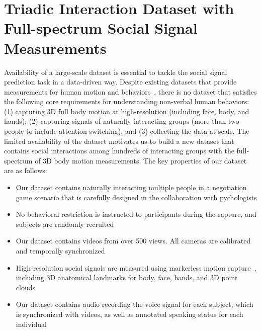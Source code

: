 
\section{Triadic Interaction Dataset with Full-spectrum Social Signal Measurements}
\label{chapter:dataset}
Availability of a large-scale dataset is essential to tackle the social signal prediction task in a data-driven way. Despite existing datasets that provide measurements for human motion and behaviors~\cite{carletta2005ami, Lepri-12, Zen-10,Cristani-11, SALSA-15, h36m_pami}, there is no dataset that satisfies the following core requirements for understanding non-verbal human behaviors: (1) capturing 3D full body motion at high-resolution (including face, body, and hands); (2) capturing signals of naturally interacting groups (more than two people to include attention switching); and (3) collecting the data at scale. The limited availability of the dataset motivates us to build a new dataset that contains social interactions among hundreds of interacting groups with the full-spectrum of 3D body motion measurements. The key properties of our dataset are as follows:
\begin{itemize}
	\item Our dataset contains naturally interacting multiple people in a negotiation game scenario that is carefully designed in the collaboration with pychologists
	\item No behavioral restriction is instructed to participants during the capture, and subjects are randomly recruited
	\item Our dataset contains videos from over 500 views. All cameras are calibrated and temporally synchronized
	\item High-resolution social signals are measured using markerless motion capture~\cite{joo2017panoptic, joo2018}, including 3D anatomical landmarks for body, face, hands, and 3D point clouds
	\item Our dataset contains audio recording the voice signal for each subject, which is synchronized with videos, as well as annotated speaking status for each individual
\end{itemize}

